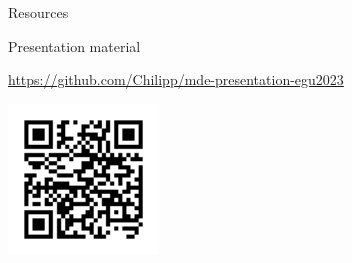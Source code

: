 \begin{frame}[t]{Resources}
    \begin{block}{Presentation material}
        \begin{small}
            \url{https://github.com/Chilipp/mde-presentation-egu2023} \\
        \end{small}
        \href{https://github.com/Chilipp/mde-presentation-egu2023}{
            \includegraphics[width=4cm]{figures/qrcode-presentation.png}
        }
    \end{block}

\end{frame}